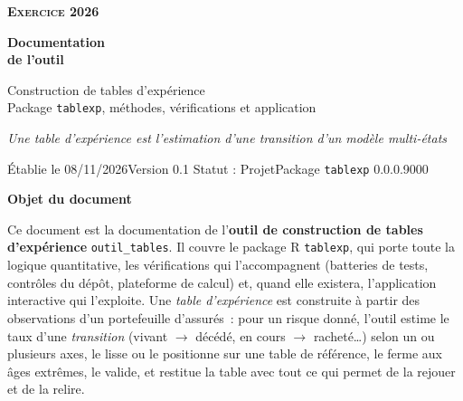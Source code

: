 \documentclass[a4paper,11pt]{article}
\newcommand{\annee}{2026}
\newcommand{\datedoc}{08/11/2026}
\newcommand{\versiondoc}{0.1}
\newcommand{\statutdoc}{Projet}
\newcommand{\titrebandeau}[1]{%
  \noindent{\color{financeblue}\rule{\linewidth}{2.5pt}}
  \par\vspace{5mm}
  {\color{greenline}\raggedright\fontsize{19}{23}\bfseries\selectfont #1\par}
  \vspace{6mm}}
\newcommand{\code}[1]{\texttt{\small #1}}
\begin{document}
\thispagestyle{empty}
%
\vspace*{2.1cm}
\noindent
{\color{financeblue}\normalsize\bfseries\scshape Exercice \annee}

\vspace{1.7cm}
\noindent
{\color{financeblue}\fontsize{28}{34}\bfseries\selectfont
 Documentation\\ de l'outil\par}

\vspace{1.1cm}
\noindent
{\color{black}\Large
 Construction de tables d'expérience\\
 Package \code{tablexp}, méthodes, vérifications et application\par}

\vspace{0.7cm}
\noindent
{\color{black}\normalsize\itshape
 Une table d'expérience est l'estimation d'une transition d'un modèle multi-états\par}

\vfill
\noindent
{\footnotesize\color{black}
 Établie le \datedoc\quad\textbar\quad Version \versiondoc\quad\textbar\quad
 Statut : \statutdoc\quad\textbar\quad Package \code{tablexp} 0.0.0.9000\par}
\vspace{2.6cm}
\clearpage

\titrebandeau{Objet du document}

\noindent
Ce document est la documentation de l'\textbf{outil de construction de tables
d'expérience} \code{outil\_tables}. Il couvre le package R \code{tablexp}, qui
porte toute la logique quantitative, les vérifications qui l'accompagnent
(batteries de tests, contrôles du dépôt, plateforme de calcul) et, quand elle
existera, l'application interactive qui l'exploite. Une \emph{table
d'expérience} est construite à partir des observations d'un portefeuille
d'assurés~: pour un risque donné, l'outil estime le taux d'une
\emph{transition} (vivant $\to$ décédé, en cours $\to$ racheté\ldots) selon un
ou plusieurs axes, le lisse ou le positionne sur une table de référence, le
ferme aux âges extrêmes, le valide, et restitue la table avec tout ce qui
permet de la rejouer et de la relire.
\end{document}
